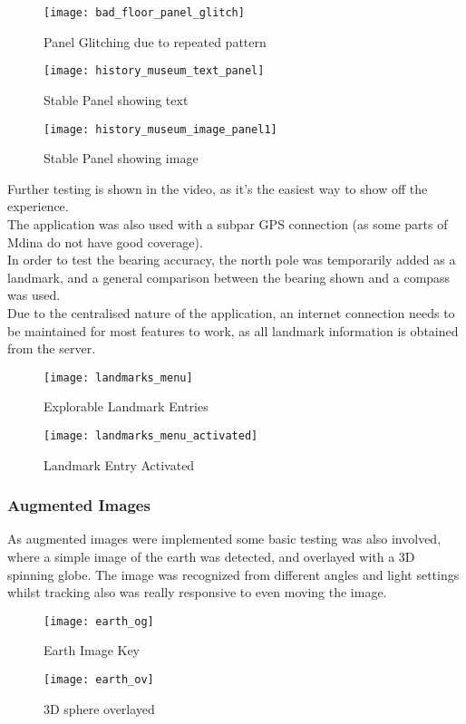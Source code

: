 \begin{figure}[!htb]
        \texttt{[image: bad\_floor\_panel\_glitch]}
            \caption{Panel Glitching due to repeated pattern}
            \label{fig:bad_panel}
    \endminipage\hfill
        \texttt{[image: history\_museum\_text\_panel]}
        \caption{Stable Panel showing text}
        \label{fig:panel_text}
    \endminipage\hfill
        \texttt{[image: history\_museum\_image\_panel1]}
        \caption{Stable Panel showing image}
        \label{fig:panel_img}
    \endminipage
    \end{figure}         
Further testing is shown in the video, as it's the easiest way to show off the experience.\\
The application was also used with a subpar GPS connection (as some parts of Mdina do not have good coverage).\\
In order to test the  bearing accuracy, the north pole was temporarily added as a landmark, and a general comparison between the bearing shown and a compass was used.\\
Due to the centralised nature of the application, an internet connection needs to be maintained for most features to work, 
as all landmark information is obtained from the server.
\begin{figure}[!htb]
        \texttt{[image: landmarks\_menu]}
            \caption{Explorable Landmark Entries}
            \label{fig:explor_lands}
    \endminipage\hfill
        \texttt{[image: landmarks\_menu\_activated]}
        \caption{Landmark Entry Activated}
        \label{fig:active_land}
    \endminipage
    \end{figure}    
\subsubsection{Augmented Images}
As augmented images were implemented some basic testing was also involved, where a simple image of the earth was detected, and overlayed with a 3D spinning globe. 
The image was recognized from different angles and light settings whilst tracking also was really responsive to even moving the image.
\begin{figure}[!htb]
        \texttt{[image: earth\_og]}
            \caption{Earth Image Key}
            \label{fig:earth_og}
    \endminipage\hfill
        \texttt{[image: earth\_ov]}
        \caption{3D sphere overlayed}
        \label{fig:earth_ov}
    \endminipage
    \end{figure}
